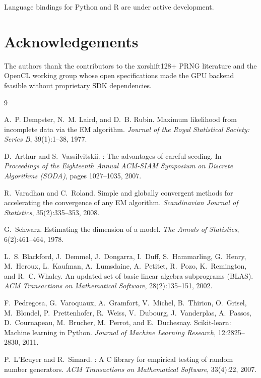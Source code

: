 ﻿\documentclass[10pt,twocolumn]{article}
\begin{document}
Language bindings for Python and R are under active development.

\section*{Acknowledgements}

The authors thank the contributors to the xorshift128+ PRNG literature and
the OpenCL working group whose open specifications made the GPU backend
feasible without proprietary SDK dependencies.




\begin{thebibliography}{9}

A.~P. Dempster, N.~M. Laird, and D.~B. Rubin.
\newblock Maximum likelihood from incomplete data via the {EM} algorithm.
\newblock \emph{Journal of the Royal Statistical Society: Series B}, 39(1):1--38, 1977.

D.~Arthur and S.~Vassilvitskii.
: The advantages of careful seeding.
\newblock In \emph{Proceedings of the Eighteenth Annual ACM-SIAM Symposium on
  Discrete Algorithms (SODA)}, pages 1027--1035, 2007.

R.~Varadhan and C.~Roland.
\newblock Simple and globally convergent methods for accelerating the
  convergence of any {EM} algorithm.
\newblock \emph{Scandinavian Journal of Statistics}, 35(2):335--353, 2008.

G.~Schwarz.
\newblock Estimating the dimension of a model.
\newblock \emph{The Annals of Statistics}, 6(2):461--464, 1978.

L.~S. Blackford, J.~Demmel, J.~Dongarra, I.~Duff, S.~Hammarling,
  G.~Henry, M.~Heroux, L.~Kaufman, A.~Lumsdaine, A.~Petitet,
  R.~Pozo, K.~Remington, and R.~C. Whaley.
\newblock An updated set of basic linear algebra subprograms ({BLAS}).
\newblock \emph{ACM Transactions on Mathematical Software}, 28(2):135--151, 2002.

F.~Pedregosa, G.~Varoquaux, A.~Gramfort, V.~Michel, B.~Thirion, O.~Grisel,
  M.~Blondel, P.~Prettenhofer, R.~Weiss, V.~Dubourg, J.~Vanderplas,
  A.~Passos, D.~Cournapeau, M.~Brucher, M.~Perrot, and E.~Duchesnay.
\newblock Scikit-learn: Machine learning in {Python}.
\newblock \emph{Journal of Machine Learning Research}, 12:2825--2830, 2011.

P.~L'Ecuyer and R.~Simard.
: A {C} library for empirical testing of random number generators.
\newblock \emph{ACM Transactions on Mathematical Software}, 33(4):22, 2007.

\end{thebibliography}
\end{document}
